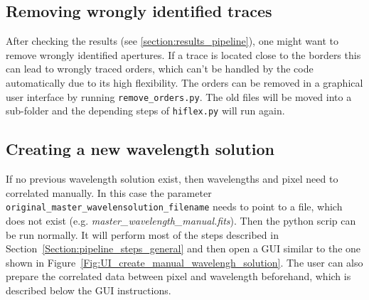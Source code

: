 \documentclass[10pt,a4paper]{article}
\begin{document}
\subsection{Removing wrongly identified traces}
After checking the results (see \ref{section:results_pipeline}), one might want to remove wrongly identified apertures. If a trace is located close to the borders this can lead to wrongly traced orders, which can't be handled by the code automatically due to its high flexibility. The orders can be removed in a graphical user interface by running \verb|remove_orders.py|. The old files will be moved into a sub-folder and the depending steps of \verb|hiflex.py| will run again.


\subsection{Creating a new wavelength solution}
\label{section:create_new_wave_solution}
If no previous wavelength solution exist, then wavelengths and pixel need to correlated manually. In this case the parameter \verb|original_master_wavelensolution_filename| needs to point to a file, which does not exist (e.g. \textit{master\_wavelength\_manual.fits}). Then the python scrip can be run normally. It will perform most of the steps described in Section~\ref{Section:pipeline_steps_general} and then open a GUI similar to the one shown in Figure~\ref{Fig:UI_create_manual_wavelengh_solution}. The user can also prepare the correlated data between pixel and wavelength beforehand, which is described below the GUI instructions.
\end{document}
